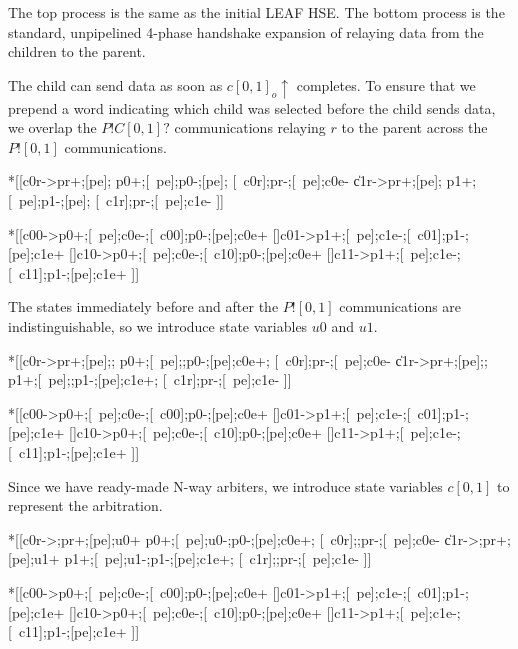 \documentclass{article}
\begin{document}
\noindent
The top process is the same as the initial LEAF HSE. The bottom process is the
standard, unpipelined 4-phase handshake expansion of relaying data from the
children to the parent.

\noindent
The child can send data as soon as $c[0,1]_o\!\uparrow$ completes.
To ensure that we prepend a word indicating which child was selected before
the child sends data, we overlap the $P!C[0,1]?$ communications relaying
$r$ to the parent across the $P![0,1]$ communications.

\begin{hse}
*[[c0r->pr+;[pe];
    p0+;[~pe];p0-;[pe];
    [~c0r];pr-;[~pe];c0e-
  \|c1r->pr+;[pe];
    p1+;[~pe];p1-;[pe];
    [~c1r];pr-;[~pe];c1e-
 ]]
\end{hse}

\begin{hse}
*[[c00->p0+;[~pe];c0e-;[~c00];p0-;[pe];c0e+
  []c01->p1+;[~pe];c1e-;[~c01];p1-;[pe];c1e+
  []c10->p0+;[~pe];c0e-;[~c10];p0-;[pe];c0e+
  []c11->p1+;[~pe];c1e-;[~c11];p1-;[pe];c1e+
 ]]
\end{hse}

\noindent
The states immediately before and after the $P![0,1]$ communications are
indistinguishable, so we introduce state variables $u0$ and $u1$.

\begin{hse}
*[[c0r->pr+;[pe];;
    p0+;[~pe];;p0-;[pe];c0e+;
    [~c0r];pr-;[~pe];c0e-
  \|c1r->pr+;[pe];;
    p1+;[~pe];;p1-;[pe];c1e+;
    [~c1r];pr-;[~pe];c1e-
 ]]
\end{hse}

\begin{hse}
*[[c00->p0+;[~pe];c0e-;[~c00];p0-;[pe];c0e+
  []c01->p1+;[~pe];c1e-;[~c01];p1-;[pe];c1e+
  []c10->p0+;[~pe];c0e-;[~c10];p0-;[pe];c0e+
  []c11->p1+;[~pe];c1e-;[~c11];p1-;[pe];c1e+
 ]]
\end{hse}

\noindent
Since we have ready-made N-way arbiters, we introduce state variables $c[0,1]$
to represent the arbitration.

\begin{hse}
*[[c0r->;pr+;[pe];u0+
    p0+;[~pe];u0-;p0-;[pe];c0e+;
    [~c0r];;pr-;[~pe];c0e-
  \|c1r->;pr+;[pe];u1+
    p1+;[~pe];u1-;p1-;[pe];c1e+;
    [~c1r];;pr-;[~pe];c1e-
 ]]
\end{hse}

\begin{hse}
*[[c00->p0+;[~pe];c0e-;[~c00];p0-;[pe];c0e+
  []c01->p1+;[~pe];c1e-;[~c01];p1-;[pe];c1e+
  []c10->p0+;[~pe];c0e-;[~c10];p0-;[pe];c0e+
  []c11->p1+;[~pe];c1e-;[~c11];p1-;[pe];c1e+
 ]]
\end{hse}
\end{document}
